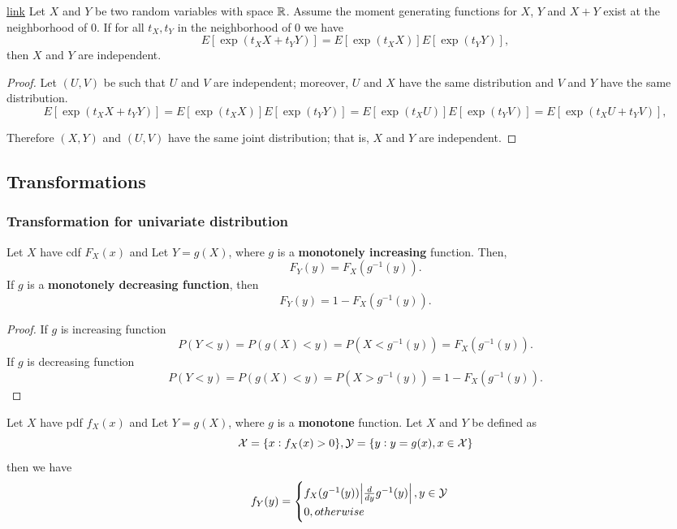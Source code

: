 \begin{refsection}
\begin{lemma}\label{ch:theory-of-probability:th:IndependenceFromMomentGeneratingFunction} \href{https://math.stackexchange.com/questions/287138/moment-generating-functions-characteristic-functions-of-x-y-factor-implies-x}{link}
Let $X$ and $Y$ be two random variables with space $\mathbb{R}$. Assume the moment generating functions for $X$, $Y$ and $X + Y$ exist at the neighborhood of 0. If for all $t_X,t_Y$ in the neighborhood of 0 we have
$$E[\exp(t_X X + t_Y Y)] = E[\exp(t_X X)] E[ \exp( t_Y Y)],$$
then
$X$ and $Y$ are independent.
\end{lemma}
\begin{proof}
Let $(U,V)$ be such that $U$ and $V$ are independent; moreover, $U$ and $X$ have the same distribution and $V$ and $Y$ have the same distribution.
$$E[\exp(t_X X + t_Y Y)] = E[\exp(t_X X)] E[ \exp( t_Y Y)] = E[\exp(t_X U)] E[ \exp( t_Y V)] = E[\exp(t_X U + t_Y V)],$$

Therefore $(X,Y)$ and $(U,V)$ have the same joint distribution; that is, $X$ and $Y$ are independent.
\end{proof}


\subsection{Transformations}
\subsubsection{Transformation for univariate distribution}
\begin{lemma}\cite[77]{casella2002statistical}\label{ch:theory-of-probability:th:changeofvariablecdf}
	Let $X$ have cdf $F_X(x)$ and Let $Y = g(X)$, where $g$ is a \textbf{monotonely increasing} function. 
	Then, 
	$$F_Y(y) = F_X(g^{-1}(y)).$$
	If $g$ is a \textbf{monotonely decreasing function}, then
	$$F_Y(y) = 1 - F_X(g^{-1}(y)).$$
\end{lemma}
\begin{proof}
	If $g$ is increasing function
	$$P(Y < y) = P(g(X) < y) = P(X < g^{-1}(y) ) = F_X(g^{-1}(y)).$$
	If $g$ is decreasing function
	$$P(Y < y) = P(g(X) < y) = P(X > g^{-1}(y) ) = 1 - F_X(g^{-1}(y)).$$
\end{proof}



\begin{lemma}\cite[77]{casella2002statistical}\label{ch:theory-of-probability:th:changeofvariable}
	Let $X$ have pdf $f_X(x)$ and Let $Y = g(X)$, where $g$ is a \textbf{monotone} function. Let $X$ and $Y$ be defined as
	$$\mathcal{X}=\{x:f_X(x) > 0\}, \mathcal{Y} = \{y:y = g(x), x\in \mathcal{X}\}$$
	then we have 
	$$f_Y(y) = \begin{cases}
	f_X(g^{-1}(y)) \abs{\frac{d}{dy}g^{-1}(y)}, y\in \mathcal{Y}\\
	0, otherwise
	\end{cases}$$
\end{lemma}


\end{refsection}
